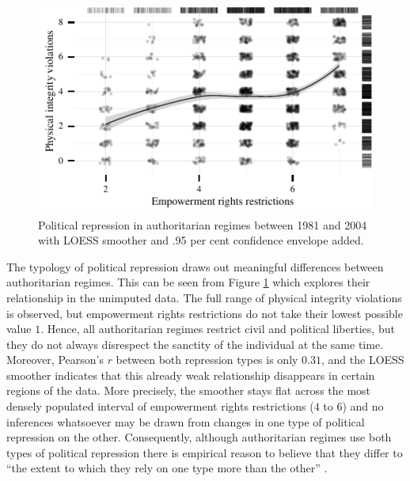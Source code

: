 \begin{figure}[!htb]
\centering
\includegraphics[width=\linewidth]{./sections/02data/scatterRepression.pdf}
\caption{Political repression in authoritarian 
regimes between 1981 and 2004 with LOESS smoother and .95 
per cent confidence envelope added.}
\label{fig:scatterRepression}
\end{figure}

The typology of political repression draws out meaningful
differences between authoritarian regimes. This can be seen 
from Figure \ref{fig:scatterRepression} which explores 
their relationship in the unimputed data. The full range of
physical integrity violations is observed, but empowerment 
rights restrictions do not take their lowest possible value
$1$. Hence, all authoritarian regimes restrict civil 
and political liberties, but they do not always disrespect 
the sanctity of the individual at the same time. Moreover, 
Pearson's $r$ between both repression types is only  
$0.31$, and the LOESS smoother indicates that this already 
weak relationship disappears in certain regions of the data.
More precisely, the smoother stays flat across the most 
densely populated interval of empowerment rights 
restrictions ($4$ to $6$) and no inferences whatsoever may 
be drawn from changes in one type of political repression on 
the other. Consequently,  although authoritarian regimes
use both types of political repression there is empirical 
reason to believe that they differ to ``the extent to
which they rely on one type more than the other'' 
\citep[336]{Frantz.2014}.


